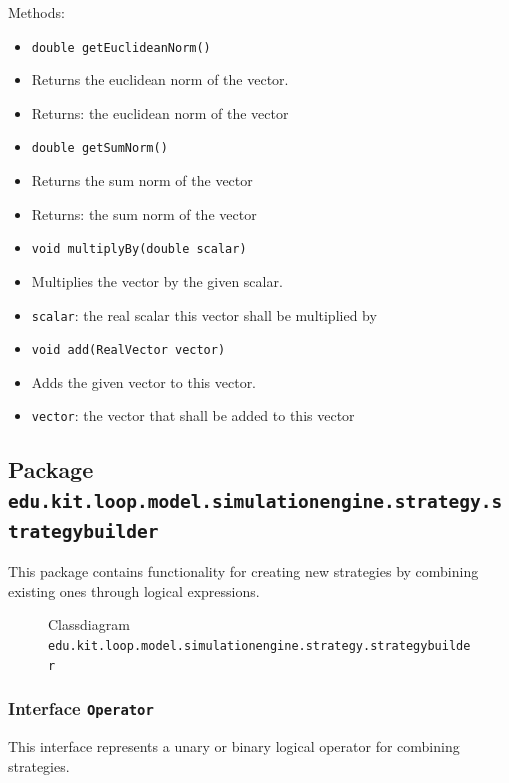 \documentclass[parskip=full,11pt]{scrartcl}
\begin{document}
Methods:
\begin{itemize}\itemsep -10pt
\item \texttt{double getEuclideanNorm()}
\item[] Returns the euclidean norm of the vector.
\item[] Returns: the euclidean norm of the vector

\item \texttt{double getSumNorm()}
\item[] Returns the sum norm of the vector
\item[] Returns: the sum norm of the vector

\item \texttt{void multiplyBy(double scalar)}
\item[] Multiplies the vector by the given scalar.
\item[] \texttt{scalar}: the real scalar this vector shall be multiplied by

\item \texttt{void add(RealVector vector)}
\item[] Adds the given vector to this vector.
\item[] \texttt{vector}: the vector that shall be added to this vector
\end{itemize}

\subsection{Package \texttt{edu.kit.loop.model.simulationengine.strategy.strategybuilder}}

This package contains functionality for creating new strategies by combining existing ones through logical expressions.

\iftrue
\begin{figure}[h]
	\centering
	\fontsize{5}{8}\selectfont
	

	\caption{Classdiagram \texttt{edu.kit.loop.model.simulationengine.strategy.strategybuilder}}
\end{figure}
\fi


\subsubsection{Interface \texttt{Operator}}

This interface represents a unary or binary logical operator for combining strategies.
\end{document}

